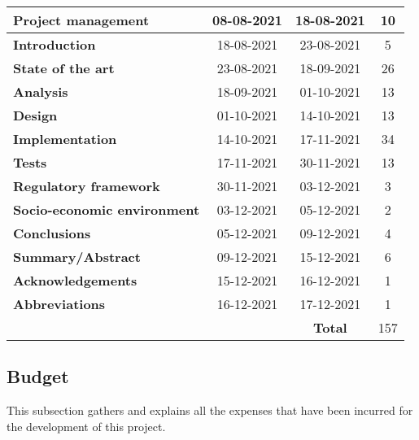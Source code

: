 \begin{longtable}[c]{lcc|c|}
	\multicolumn{1}{|l|}{\textbf{Project management}}         & \multicolumn{1}{c|}{08-08-2021} & 18-08-2021     & 10  \\ \hline
	\multicolumn{1}{|l|}{\textbf{Introduction}}               & \multicolumn{1}{c|}{18-08-2021} & 23-08-2021     & 5   \\ \hline
	\multicolumn{1}{|l|}{\textbf{State of the art}}           & \multicolumn{1}{c|}{23-08-2021} & 18-09-2021     & 26  \\ \hline
	\multicolumn{1}{|l|}{\textbf{Analysis}}                   & \multicolumn{1}{c|}{18-09-2021} & 01-10-2021     & 13  \\ \hline
	\multicolumn{1}{|l|}{\textbf{Design}}                     & \multicolumn{1}{c|}{01-10-2021} & 14-10-2021     & 13  \\ \hline
	\multicolumn{1}{|l|}{\textbf{Implementation}}             & \multicolumn{1}{c|}{14-10-2021} & 17-11-2021     & 34  \\ \hline
	\multicolumn{1}{|l|}{\textbf{Tests}}                      & \multicolumn{1}{c|}{17-11-2021} & 30-11-2021     & 13  \\ \hline
	\multicolumn{1}{|l|}{\textbf{Regulatory framework}}       & \multicolumn{1}{c|}{30-11-2021} & 03-12-2021     & 3   \\ \hline
	\multicolumn{1}{|l|}{\textbf{Socio-economic environment}} & \multicolumn{1}{c|}{03-12-2021} & 05-12-2021     & 2   \\ \hline
	\multicolumn{1}{|l|}{\textbf{Conclusions}}                & \multicolumn{1}{c|}{05-12-2021} & 09-12-2021     & 4   \\ \hline
	\multicolumn{1}{|l|}{\textbf{Summary/Abstract}}           & \multicolumn{1}{c|}{09-12-2021} & 15-12-2021     & 6   \\ \hline
	\multicolumn{1}{|l|}{\textbf{Acknowledgements}}           & \multicolumn{1}{c|}{15-12-2021} & 16-12-2021     & 1   \\ \hline
	\multicolumn{1}{|l|}{\textbf{Abbreviations}}              & \multicolumn{1}{c|}{16-12-2021} & 17-12-2021     & 1   \\ \hline
	                                                          &                                 & \textbf{Total} & 157 \\ \cline{4-4}
\end{longtable}

\subsection{Budget}\label{subsec:budget}
This subsection gathers and explains all the expenses that have been incurred for the development of this project.

